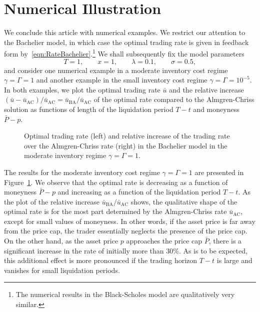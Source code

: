 \documentclass[11pt]{article}
\numberwithin{equation}{section}
\newlength\figheight
\newlength\figwidth
\theoremstyle{definition}
\theoremstyle{remark}
\begin{document}
\section{Numerical Illustration}\label{sec:Numerics}

We conclude this article with numerical examples. We restrict our attention to the Bachelier model, in which case the optimal trading rate is given in feedback form by~\eqref{eqn:RateBachelier}.\footnote{The numerical results in the Black-Scholes model are qualitatively very similar.} We shall subsequently fix the model parameters
\[
 T = 1,\qquad x = 1,\qquad \lambda = 0.1,\qquad \sigma = 0.5,
\]
and consider one numerical example in a moderate inventory cost regime $\gamma = \Gamma = 1$ and another example in the small inventory cost regime $\gamma = \Gamma = 10^{-5}$. In both examples, we plot the optimal trading rate $\bar u$ and the relative increase $(\bar u - \bar u_{\mathrm{AC}}) / \bar u_{\mathrm{AC}}= \bar u_{\mathrm{BA}} / \bar u_{\mathrm{AC}}$ of the optimal rate compared to the Almgren-Chriss solution as functions of length of the liquidation period $T-t$ and moneyness $\bar P - p$.

\begin{figure}[ht]
 \setlength{}
 \setlength{}
 \centering
 \hspace{0.5em}
 
 \caption{Optimal trading rate (left) and relative increase of the trading rate over the Almgren-Chriss rate (right) in the Bachelier model in the moderate inventory regime $\gamma = \Gamma = 1$.}
 \label{fig:Bachelier:moderate}
\end{figure}

The results for the moderate inventory cost regime $\gamma = \Gamma = 1$ are presented in Figure~\ref{fig:Bachelier:moderate}. We observe that the optimal rate is decreasing as a function of moneyness $\bar P-p$ and increasing as a function of the liquidation period $T-t$. As the plot of the relative increase $\bar u_{\mathrm{BA}} / \bar u_{\mathrm{AC}}$ shows, the qualitative shape of the optimal rate is for the most part determined by the Almgren-Chriss rate $\bar u_{\mathrm{AC}}$, except for small values of moneyness. In other words, if the asset price is far away from the price cap, the trader essentially neglects the presence of the price cap. On the other hand, as the asset price $p$ approaches the price cap $\bar P$, there is a significant increase in the rate of initially more than 30\%. As is to be expected, this additional effect is more pronounced if the trading horizon $T-t$ is large and vanishes for small liquidation periods.
\end{document}
